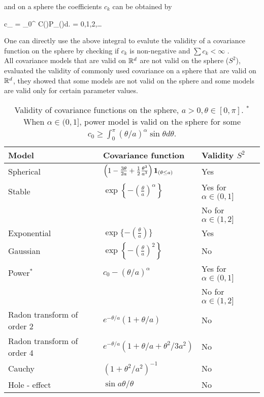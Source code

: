 and on a sphere the coefficients $c_k$ can be obtained by

\beq \label{covs2_coef}
c_{\nu} = \int_0^{\pi} C(\theta)P_{\nu}(\cos\theta)d\theta. \quad \nu = 0,1,2,\ldots
\eeq

One can directly use the above integral to evalute the validity of a covariance function on the sphere by checking if $c_k$ is non-negative and $\sum c_k < \infty$ .\\ 

All covariance models that are valid on $\mathbb{R}^d$ are not valid on the sphere ($S^2$), \cite{HuangZhangRobeson2011} evaluated the validity of commonly used covariance on a sphere that are valid on $\mathbb{R}^d$, they showed that some models are not valid on the sphere and some models are valid only for certain parameter values.  
 

\begin{table}[H]
	\label{valid_cov_models}
	\centering
	\begin{tabular}[htb]{lll} \hline \hline
		Model & Covariance function & Validity  $S^2$           \\   \hline Spherical  &
		$\left(1-\frac{3\theta}{2a} + \frac{1}{2}
		\frac{\theta^3}{a^3}\right){\bf 1}_{(\theta \le a)}$ & Yes   \\
		[2ex]
		Stable     & $\exp\left\{-\left(\frac{\theta}{a}\right)^\alpha\right\}$ & Yes for $\alpha \in (0,1]$  \\
		      &                     & No for $\alpha \in (1,2]$ \\ [2ex] \hspace{0.2in} Exponential &
		$\exp \{-\left(\frac{\theta}{a}\right) \}$ & Yes \\ [2ex]
		\hspace{0.2in} Gaussian & $\exp\left\{-\left(\frac{\theta}{a} \right)^2
		\right\}$  & No \\ [2ex]
		Power$^*$   & $c_0 - (\theta/a)^\alpha$ & Yes for  $\alpha \in (0,1] $  \\
		& & No for $\alpha \in (1,2]$ \\ [2ex]
		Radon transform of order 2         & $e^{-\theta/a}(1+\theta/a)$ &
		No        \\ [2ex] Radon transform of order 4         &
		$e^{-\theta/a} (1+\theta/a+\theta^2/3a^2)$  & No  \\ [2ex] Cauchy &
		$(1+\theta^2/a^2)^{-1}$ &  No      \\ [2ex] Hole - effect & $\sin
		a\theta / \theta$ & No    \\ \hline \hline
	\end{tabular}
	\caption{Validity of covariance functions on the sphere, $a >
		0,\theta \in [0,\pi]$. $^*$When $\alpha \in (0,1]$, power model is
			valid on the sphere  for some $c_0 \ge \int_0^\pi
			(\theta/a)^{\alpha} \sin \theta d \theta$.} \label{tab:t1}
				
	\end{table}
	
